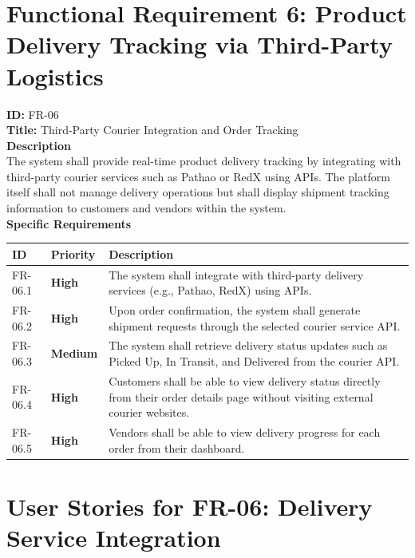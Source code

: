 \section{Functional Requirement 6: Product Delivery Tracking via Third-Party Logistics
}

\textbf{ID:} FR-06 \\
\textbf{Title:} Third-Party Courier Integration and Order Tracking
\\
\textbf{Description}\\
The system shall provide real-time product delivery tracking by integrating with third-party courier services such as Pathao or RedX using APIs. The platform itself shall not manage delivery operations but shall display shipment tracking information to customers and vendors within the system.\\
\textbf{Specific Requirements}

\begin{table}[H]
\centering
\label{tab:delivery-requirements}
\begin{tabular}{>{\raggedright\arraybackslash}p{2cm}>{\centering\arraybackslash}p{2cm}>{\raggedright\arraybackslash}p{10cm}}
\toprule
\textbf{ID} & \textbf{Priority} & \textbf{Description} \\
\midrule
FR-06.1 & \textcolor{highcolor}{\textbf{High}} & The system shall integrate with third-party delivery services (e.g., Pathao, RedX) using APIs. \\
\midrule
FR-06.2 & \textcolor{highcolor}{\textbf{High}} & Upon order confirmation, the system shall generate shipment requests through the selected courier service API. \\
\midrule
FR-06.3 & \textcolor{mediumcolor}{\textbf{Medium}} & The system shall retrieve delivery status updates such as Picked Up, In Transit, and Delivered from the courier API. \\
\midrule
FR-06.4 & \textcolor{highcolor}{\textbf{High}} & Customers shall be able to view delivery status directly from their order details page without visiting external courier websites. \\
\midrule
FR-06.5 & \textcolor{highcolor}{\textbf{High}} & Vendors shall be able to view delivery progress for each order from their dashboard. \\
\bottomrule
\end{tabular}
\end{table}

\section*{User Stories for FR-06: Delivery Service Integration}


